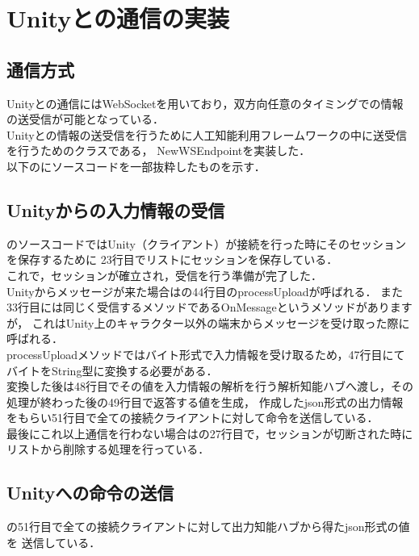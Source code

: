 \section{Unityとの通信の実装}
\subsection{通信方式}
Unityとの通信にはWebSocketを用いており，双方向任意のタイミングでの情報の送受信が可能となっている．\\
Unityとの情報の送受信を行うために人工知能利用フレームワークの中に送受信を行うためのクラスである，
NewWSEndpointを実装した．\\

以下のにソースコードを一部抜粋したものを示す．\\


\subsection{Unityからの入力情報の受信}
のソースコードではUnity（クライアント）が接続を行った時にそのセッションを保存するために
23行目でリストにセッションを保存している．\\

これで，セッションが確立され，受信を行う準備が完了した．\\

Unityからメッセージが来た場合はの44行目のprocessUploadが呼ばれる．
また33行目には同じく受信するメソッドであるOnMessageというメソッドがありますが，
これはUnity上のキャラクター以外の端末からメッセージを受け取った際に呼ばれる．\\

processUploadメソッドではバイト形式で入力情報を受け取るため，47行目にてバイトをString型に変換する必要がある．\\
変換した後は48行目でその値を入力情報の解析を行う解析知能ハブへ渡し，その処理が終わった後の49行目で返答する値を生成，
作成したjson形式の出力情報をもらい51行目で全ての接続クライアントに対して命令を送信している．\\



最後にこれ以上通信を行わない場合はの27行目で，セッションが切断された時に
リストから削除する処理を行っている．\\


\subsection{Unityへの命令の送信}
の51行目で全ての接続クライアントに対して出力知能ハブから得たjson形式の値を
送信している．\\

